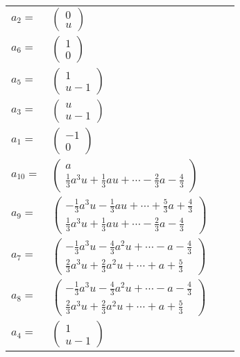 \documentclass[1p]{elsarticle_modified}
\theoremstyle{definition}
\begin{document}
\begin{tabular}{m{7pt} m{180pt} m{7pt} m{180pt} }
\flushright $a_{2}=$&$\begin{pmatrix}0\\u\end{pmatrix}$ \\
\flushright $a_{6}=$&$\begin{pmatrix}1\\0\end{pmatrix}$ \\
\flushright $a_{5}=$&$\begin{pmatrix}1\\u-1\end{pmatrix}$ \\
\flushright $a_{3}=$&$\begin{pmatrix}u\\u-1\end{pmatrix}$ \\
\flushright $a_{1}=$&$\begin{pmatrix}-1\\0\end{pmatrix}$ \\
\flushright $a_{10}=$&$\begin{pmatrix}a\\\frac{1}{3} a^3 u+\frac{1}{3} a u+\cdots-\frac{2}{3} a-\frac{4}{3}\end{pmatrix}$ \\
\flushright $a_{9}=$&$\begin{pmatrix}-\frac{1}{3} a^3 u-\frac{1}{3} a u+\cdots+\frac{5}{3} a+\frac{4}{3}\\\frac{1}{3} a^3 u+\frac{1}{3} a u+\cdots-\frac{2}{3} a-\frac{4}{3}\end{pmatrix}$ \\
\flushright $a_{7}=$&$\begin{pmatrix}-\frac{1}{3} a^3 u-\frac{4}{3} a^2 u+\cdots- a-\frac{4}{3}\\\frac{2}{3} a^3 u+\frac{2}{3} a^2 u+\cdots+a+\frac{5}{3}\end{pmatrix}$ \\
\flushright $a_{8}=$&$\begin{pmatrix}-\frac{1}{3} a^3 u-\frac{4}{3} a^2 u+\cdots- a-\frac{4}{3}\\\frac{2}{3} a^3 u+\frac{2}{3} a^2 u+\cdots+a+\frac{5}{3}\end{pmatrix}$ \\
\flushright $a_{4}=$&$\begin{pmatrix}1\\u-1\end{pmatrix}$ \\

\end{tabular}
\end{document}
